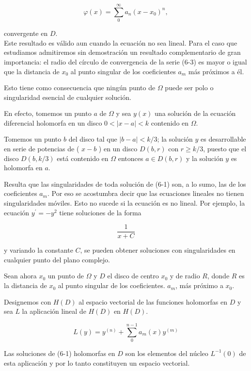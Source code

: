 \documentclass[10pt]{article}
\theoremstyle{plain}
\theoremstyle{definition}
\theoremstyle{remark}
\begin{document}
\begin{equation*}
\varphi(x)=\sum_{0}^{\infty} a_{n}\left(x-x_{0}\right)^{n}, \tag{6-3}
\end{equation*}


convergente en $D$.\\
Este resultado es válido aun cuando la ecuación no sea lineal. Para el caso que estudiamos admitiremos sin demostración un resultado complementario de gran importancia: el radio del círculo de convergencia de la serie (6-3) es mayor o igual que la distancia de $x_{0}$ al punto singular de los coeficientes $a_{m}$ más próximos a él.

Esto tiene como consecuencia que ningún punto de $\Omega$ puede ser polo o singularidad esencial de cualquier solución.

En efecto, tomemos un punto $a$ de $\Omega$ y sea $y(x)$ una solución de la ecuación diferencial holomorfa en un disco $0<|x-a|<k$ contenido en $\Omega$.

Tomemos un punto $b$ del disco tal que $|b-a|<k / 3$; la solución $y$ es desarrollable en serie de potencias de ( $x-b$ ) en un disco $D(b, r)$ con $r \geqslant k / 3$, puesto que el disco $D(b, k / 3)$ está contenido en $\Omega$ entonces $a \in D(b, r)$ y la solución $y$ es holomorfa en $a$.

Resulta que las singularidades de toda solución de (6-1) son, a lo sumo, las de los coeficientes $a_{m}$. Por eso se acostumbra decir que las ecuaciones lineales no tienen singularidades móviles. Esto no sucede si la ecuación es no lineal. Por ejemplo, la ecuación $y^{\prime}=-y^{2}$ tiene soluciones de la forma

$$
\frac{1}{x+C}
$$

y variando la constante $C$, se pueden obtener soluciones con singularidades en cualquier punto del plano complejo.

Sean ahora $x_{0}$ un punto de $\Omega$ y $D$ el disco de centro $x_{0}$ y de radio $R$, donde $R$ es la distancia de $x_{0}$ al punto singular de los coeficientes. $a_{m}$, más próximo a $x_{0}$.

Designemos con $H(D)$ al espacio vectorial de las funciones holomorfas en $D$ y sea $L$ la aplicación lineal de $H(D)$ en $H(D)$.


\begin{equation*}
L(y)=y^{(n)}+\sum_{0}^{n-1} a_{m}(x) y^{(m)} \tag{6-4}
\end{equation*}


Las soluciones de (6-1) holomorfas en $D$ son los elementos del núcleo $L^{-1}(0)$ de esta aplicación y por lo tanto constituyen un espacio vectorial.
\end{document}
